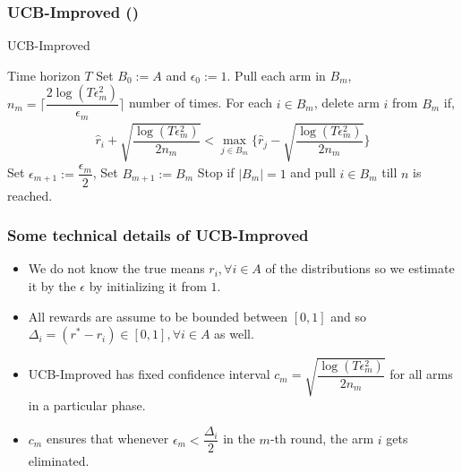 \begin{frame}
\frametitle{UCB-Improved (\cite{auer2010ucb})}
\begin{algorithm}[H]
\caption{UCB-Improved}
\small
\begin{algorithmic}[1]
 Time horizon $T$
 Set $B_{0}:=A$ and ${\epsilon}_{0}:=1$.
\State Pull each arm in $B_m$, $n_{m}=\bigg\lceil\dfrac{2\log{( T{\epsilon}_{m}^{2})}}{{\epsilon}_{m}}\bigg\rceil$ number of times.
\ArmElim
\State For each $i \in B_{m}$, delete arm ${i}$ from $B_{m}$ if,
\begin{align*}
\hat{r}_{i} + \sqrt{\dfrac{\log{(T{\epsilon}_{m}^{2})}}{2 n_{m}}}  < \max_{{j}\in B_{m}}\bigg\lbrace\hat{r}_{j} -\sqrt{\dfrac{\log{( T{\epsilon}_{m}^{2})}}{2 n_{m}}} \bigg\rbrace
\end{align*}
\EndArmElim
\State Set ${\epsilon}_{m+1}:=\dfrac{{\epsilon}_{m}}{2}$, Set $B_{m+1}:=B_{m}$
\State Stop if $|B_{m}|=1$ and pull ${i}\in B_{m}$ till $n$ is reached.
\EndFor
\end{algorithmic}
\end{algorithm}
\end{frame}

\begin{frame}
\frametitle{Some technical details of UCB-Improved}
\begin{itemize}
\item<1-> We do not know the true means $r_i ,\forall i\in A$ of the distributions so we estimate it by the ${\epsilon}$ by initializing it from $1$.
\item<2-> All rewards are assume to be bounded between $[0,1]$ and so $\Delta_{i} = (r^* - r_i)\in [0,1],\forall i\in A$ as well.
\item<3-> UCB-Improved has fixed confidence interval  $c_{m}=\sqrt{\dfrac{\log{(T{\epsilon}_{m}^{2})}}{2 n_{m}}}$ for all arms in a particular phase.
\item<4-> $c_m$ ensures that whenever ${\epsilon}_{m}<\dfrac{\Delta_i}{2}$ in the $m$-th round, the arm $i$ gets eliminated.
\end{itemize}
\end{frame}